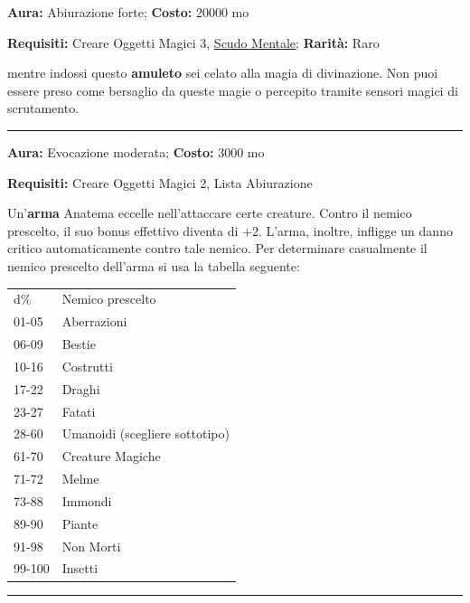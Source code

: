 \begin{multicols}{2}
\textbf{Aura:} Abiurazione forte; \textbf{Costo:} 20000 mo

\textbf{Requisiti:} Creare Oggetti Magici 3, \hyperlink{AnellodelloScudoMentale}{Scudo Mentale}; \textbf{Rarità:} Raro

mentre indossi questo \textbf{amuleto} sei celato alla magia di divinazione. Non puoi essere preso come bersaglio da queste magie o percepito tramite sensori magici di scrutamento.

\smallskip\noindent\rule{\linewidth}{2pt}  \hypertarget{armaAnatema}{}\medskip{}\noindent\label{armaAnatema}

\textbf{Aura:} Evocazione moderata; \textbf{Costo:} 3000 mo

\textbf{Requisiti:} Creare Oggetti Magici 2, Lista Abiurazione

Un'\textbf{arma} Anatema eccelle nell'attaccare certe creature. Contro il nemico prescelto, il suo bonus effettivo diventa di +2. L'arma, inoltre, infligge un danno critico automaticamente contro tale nemico. Per determinare casualmente il nemico prescelto dell'arma si usa la tabella seguente:

\medskip

\begin{tabular}{ll}
d\% &Nemico prescelto\\
01-05 &Aberrazioni\\
06-09 &Bestie\\
10-16 &Costrutti\\
17-22 &Draghi\\
23-27 &Fatati\\
28-60 &Umanoidi (scegliere sottotipo)\\
61-70 &Creature Magiche\\
71-72 &Melme\\
73-88 &Immondi\\
89-90 &Piante\\
91-98 &Non Morti\\
99-100 &Insetti
\end{tabular}

\medskip

\smallskip\noindent\rule{\linewidth}{2pt}  \hypertarget{AnelloAccumulaIncantesimi}{}\medskip{}\noindent\label{AnelloAccumulaIncantesimi}


\end{multicols}
